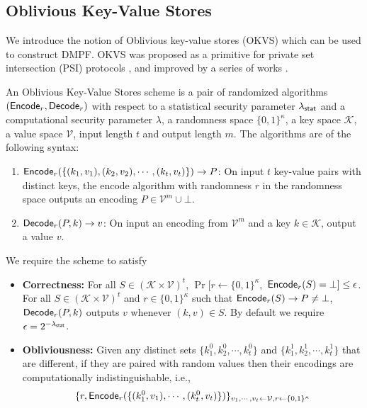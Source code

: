 \subsection{Oblivious Key-Value Stores}\label{sec:prelim_okvs}
We introduce the notion of Oblivious key-value stores (OKVS) which can be used to construct DMPF. OKVS was proposed as a primitive for private set intersection (PSI) protocols \cite{cryptoeprint:2021/883}, and improved by a series of works \cite{cryptoeprint:2022/320,cryptoeprint:2023/903}. 
\begin{definition}\label{def:OKVS}
  An Oblivious Key-Value Stores scheme is a pair of randomized algorithms $({\sf Encode}_r,{\sf Decode}_r)$ with respect to a statistical security parameter $\lambda_{\sf stat}$ and a computational security parameter $\lambda$, a randomness space $\{0,1\}^\kappa$, a key space $\mathcal{K}$, a value space $\mathcal{V}$, input length $t$ and output length $m$. The algorithms are of the following syntax: 
  \begin{enumerate}
    \item ${\sf Encode}_r(\{(k_1,v_1),(k_2,v_2),\cdots,(k_t,v_t)\})\rightarrow P$: On input $t$ key-value pairs with distinct keys, the encode algorithm with randomness $r$ in the randomness space outputs an encoding $P\in\mathcal{V}^m\cup\bot$.
    \item ${\sf Decode}_r(P,k)\rightarrow v$: On input an encoding from $\mathcal{V}^m$ and a key $k\in\mathcal{K}$, output a value $v$. 
  \end{enumerate}
  We require the scheme to satisfy
  \begin{itemize}[itemsep=5pt]
    \item[]\textbf{Correctness: }For all $S\in(\mathcal{K}\times\mathcal{V})^t$, $\Pr[{r\leftarrow\{0,1\}^\kappa},$ ${\sf Encode}_r(S)=\bot]\le \epsilon$. For all $S\in(\mathcal{K}\times \mathcal{V})^t$ and $r\in \{0,1\}^\kappa$ such that ${\sf Encode}_r(S)\rightarrow P\not=\bot$, ${\sf Decode}_r(P,k)$ outputs $ v$ whenever $(k,v)\in S$. By default we require $\epsilon = 2^{-\lambda_{\sf stat}}$.
    \item[] \textbf{Obliviousness: }Given any distinct sets $\{k_1^0,k_2^0,\cdots,k_t^0\}$ and $\{k_1^1,k_2^1,\cdots,k_t^1\}$ that are different, if they are paired with random values then their encodings are computationally indistinguishable, i.e., 
  \begin{align*}
    &\{r, \Encode_r(\{(k_1^0,v_1),\cdots,(k_t^0,v_t)\})\}_{v_1,\cdots,v_t\leftarrow \mathcal{V},r\leftarrow\{0,1\}^\kappa}\\

\end{align*}
\end{itemize}
\end{definition}
